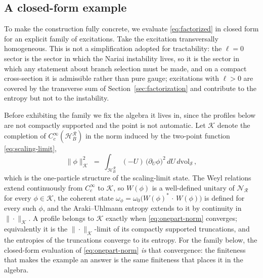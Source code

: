 \documentclass[11pt]{article}
\newcommand{\Nariai}{Nariai}
\begin{document}
\subsection{A closed-form example}
\label{sec:example}

To make the construction fully concrete, we evaluate \eqref{eq:factorized} in closed form for an explicit family of excitations. Take the excitation transversally homogeneous. This is not a simplification adopted for tractability: the $\ell = 0$ sector is the sector in which the \Nariai{} instability lives, so it is the sector in which any statement about branch selection must be made, and on a compact cross-section it is admissible rather than pure gauge; excitations with $\ell > 0$ are covered by the transverse sum of Section~\ref{sec:factorization} and contribute to the entropy but not to the instability.

Before exhibiting the family we fix the algebra it lives in, since the profiles below are not compactly supported and the point is not automatic. Let $\mathcal{K}$ denote the completion of $C_c^\infty(\mathcal{H}_B^{\mathcal{R}})$ in the norm induced by the two-point function \eqref{eq:scaling-limit},
\begin{equation}
\|\phi\|_{\mathcal{K}}^{2}
\;=\;
\int_{\mathcal{H}_B^{\mathcal{R}}} (-U)\,\big(\partial_U \phi\big)^{2}\,
dU\, d\mathrm{vol}_{\mathcal{S}}\,,
\label{eq:onepart-norm}
\end{equation}
which is the one-particle structure of the scaling-limit state. The Weyl relations extend continuously from $C_c^\infty$ to $\mathcal{K}$, so $W(\phi)$ is a well-defined unitary of $\mathscr{N}_{\mathcal{R}}$ for every $\phi \in \mathcal{K}$, the coherent state $\omega_\phi = \omega_0\big(W(\phi)^{*}\,\cdot\,W(\phi)\big)$ is defined for every such $\phi$, and the Araki--Uhlmann entropy extends to it by continuity in $\|\cdot\|_{\mathcal{K}}$. A profile belongs to $\mathcal{K}$ exactly when \eqref{eq:onepart-norm} converges; equivalently it is the $\|\cdot\|_{\mathcal{K}}$-limit of its compactly supported truncations, and the entropies of the truncations converge to its entropy. For the family below, the closed-form evaluation of \eqref{eq:onepart-norm} \emph{is} that convergence: the finiteness that makes the example an answer is the same finiteness that places it in the algebra.
\end{document}
